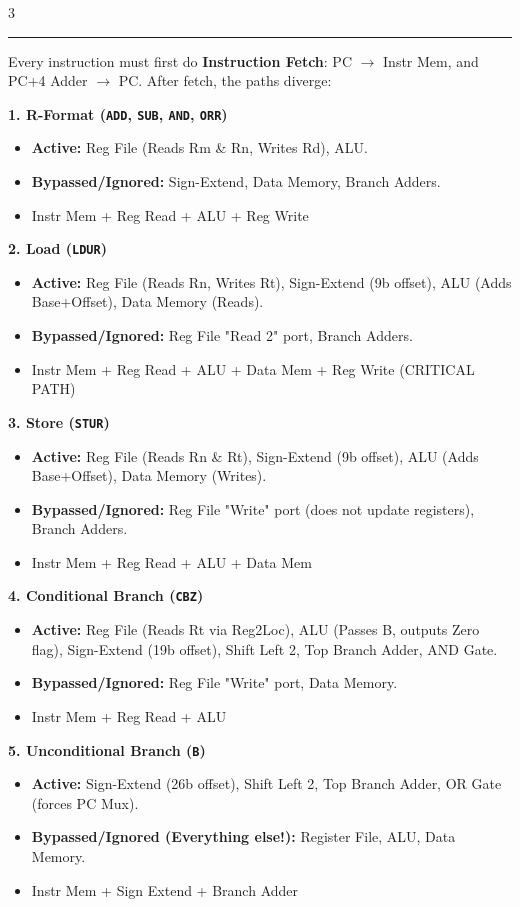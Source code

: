\documentclass[8pt, letterpaper]{extarticle}
\newcommand{\sectionhead}[1]{%
    \vspace{1.5mm}{\small\bfseries\uppercase{#1}}\vspace{0.2mm}\hrule\vspace{0.5mm}%
}
\begin{document}
\begin{multicols}{3}
\sectionhead{Datapath Usage: Who Uses What?}
Every instruction must first do \textbf{Instruction Fetch}: PC $\to$ Instr Mem, and PC+4 Adder $\to$ PC. After fetch, the paths diverge:

\textbf{1. R-Format (\texttt{ADD}, \texttt{SUB}, \texttt{AND}, \texttt{ORR})}
\begin{itemize}
    \item \textbf{Active:} Reg File (Reads Rm \& Rn, Writes Rd), ALU.
    \item \textbf{Bypassed/Ignored:} Sign-Extend, Data Memory, Branch Adders.
    \item Instr Mem + Reg Read + ALU + Reg Write
\end{itemize}

\textbf{2. Load (\texttt{LDUR})}
\begin{itemize}
    \item \textbf{Active:} Reg File (Reads Rn, Writes Rt), Sign-Extend (9b offset), ALU (Adds Base+Offset), Data Memory (Reads).
    \item \textbf{Bypassed/Ignored:} Reg File "Read 2" port, Branch Adders.
    \item Instr Mem + Reg Read + ALU + Data Mem + Reg Write (CRITICAL PATH)
\end{itemize}

\textbf{3. Store (\texttt{STUR})}
\begin{itemize}
    \item \textbf{Active:} Reg File (Reads Rn \& Rt), Sign-Extend (9b offset), ALU (Adds Base+Offset), Data Memory (Writes).
    \item \textbf{Bypassed/Ignored:} Reg File "Write" port (does not update registers), Branch Adders.
    \item Instr Mem + Reg Read + ALU + Data Mem
\end{itemize}

\textbf{4. Conditional Branch (\texttt{CBZ})}
\begin{itemize}
    \item \textbf{Active:} Reg File (Reads Rt via Reg2Loc), ALU (Passes B, outputs Zero flag), Sign-Extend (19b offset), Shift Left 2, Top Branch Adder, AND Gate.
    \item \textbf{Bypassed/Ignored:} Reg File "Write" port, Data Memory.
    \item Instr Mem + Reg Read + ALU
\end{itemize}

\textbf{5. Unconditional Branch (\texttt{B})}
\begin{itemize}
    \item \textbf{Active:} Sign-Extend (26b offset), Shift Left 2, Top Branch Adder, OR Gate (forces PC Mux).
    \item \textbf{Bypassed/Ignored (Everything else!):} Register File, ALU, Data Memory.
    \item Instr Mem + Sign Extend + Branch Adder
\end{itemize}


\end{multicols}
\end{document}
